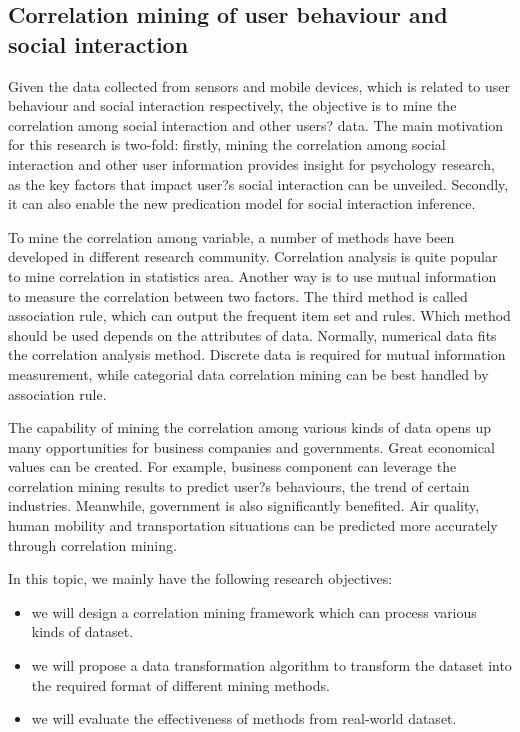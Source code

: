 \subsection{Correlation mining of user behaviour and social interaction}

Given the data collected from sensors and mobile devices, which is related to user behaviour and social interaction respectively,  the objective is to mine the correlation among social interaction and other users? data. The main motivation for this research is two-fold: firstly, mining the correlation among social interaction and other user information provides insight for psychology research, as the key factors that impact user?s social interaction can be unveiled. Secondly, it can also enable the new predication model for social interaction inference.

To mine the correlation among variable, a number of methods have been developed in different research community. Correlation analysis is quite popular to mine correlation in statistics area. Another way is to use mutual information to measure the correlation between two factors. The third method is called association rule, which can output the frequent item set and rules. Which method should be used depends on the attributes of data. Normally, numerical data fits the correlation analysis method. Discrete data is required for mutual information measurement, while categorial data correlation mining can be best handled by association rule.

The capability of mining the correlation among various kinds of data opens up many opportunities for business companies and governments. Great economical values can be created. For example, business component can leverage the correlation mining results to predict user?s behaviours, the trend of certain industries. Meanwhile, government is also significantly benefited. Air quality, human mobility and transportation situations can be predicted more accurately through correlation mining.

In this topic, we mainly have the following research objectives:

\begin{itemize}
  \item we will design a correlation mining framework which can process various kinds of dataset.
  \item we will propose a data transformation algorithm to transform the dataset into the required format of different mining methods.
  \item we will evaluate the effectiveness of methods from real-world dataset.
 \end{itemize}
